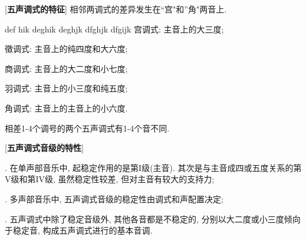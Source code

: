 \clearpage

[\textbf{五声调式的特征}] 相邻两调式的差异发生在``宫"和''角"两音上.\par
\startextract \Notes \wh d\wh e\wh f \wh h\wh i\wh k\en\zendextract
\startextract \Notes \wh d\wh e\wh g\wh h\wh i\wh k\en\zendextract
\startextract \Notes \wh d\wh e\wh g\wh h\wh j\wh k\en\zendextract
\startextract \Notes \wh d\wh f\wh g\wh h\wh j\wh k\en\zendextract
\startextract \Notes \wh d\wh f\wh g\wh i\wh j\wh k\en\zendextract
\qquad 宫调式: 主音上的大三度;\par
\qquad 徵调式: 主音上的纯四度和大六度;\par
\qquad 商调式: 主音上的大二度和小七度;\par
\qquad 羽调式: 主音上的小三度和纯五度;\par
\qquad 角调式: 主音上的主音上的小六度.\par
\qquad 相差1-4个调号的两个五声调式有1-4个音不同.\par

[\textbf{五声调式音级的特性}]\par
{}. 在单声部音乐中, 起稳定作用的是第I级(主音). 其次是与主音成四或五度关系的第V级和第IV级, 虽然稳定性较差, 但对主音有较大的支持力;\par
{}. 多声部音乐中, 五声调式音级的稳定性由调式和声配置决定;\par
{}. 五声调式中除了稳定音级外, 其他各音都是不稳定的, 分别以大二度或小三度倾向于稳定音, 构成五声调式进行的基本音调.\par




